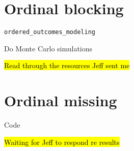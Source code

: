 \section*{Ordinal blocking}
	\begin{coi}
		\item \texttt{ordered\_outcomes\_modeling}
			\begin{coi}
				\item Do Monte Carlo simulations
					\begin{coi}
						\item \hl{Read through the resources Jeff sent me}
					\end{coi}
			\end{coi}
	\end{coi}
	
\section*{Ordinal missing}
	\begin{coi}
		\item Code
			\begin{coi}
				\item \hl{Waiting for Jeff to respond re results}
			\end{coi}
	\end{coi}


	


	




